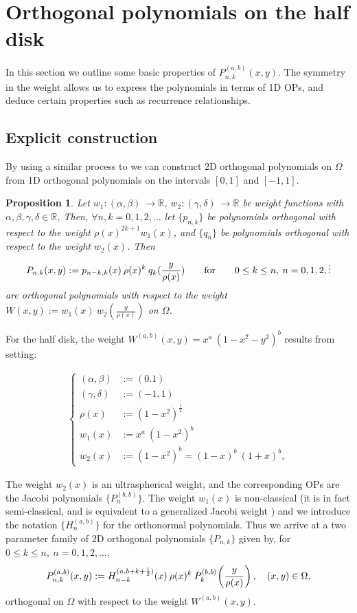 \documentclass[11pt, oneside]{article}   	%
\newcommand{\half}{\frac{1}{2}}
\newcommand{\R}{\mathbb{R}}
\newcommand{\Pnk}{P_{n,k}}
\newtheorem{proposition}{Proposition}
\begin{document}
\section{Orthogonal polynomials on the half disk}\label{Section:OPs}

In this section we outline some basic properties of $P_{n,k}^{(a,b)}(x,y)$. The symmetry in the weight allows us to express the polynomials in terms of 1D OPs, and deduce certain properties such as recurrence relationships. 

\subsection{Explicit construction}


By using a similar process to \cite[p55--56]{dunkl2014orthogonal} we can construct 2D orthogonal polynomials on $\Omega$ from 1D orthogonal polynomials on the intervals \([0,1]\) and \([-1,1]\).

\begin{proposition}
Let \(w_1 : (\alpha,\beta) \: \to \R\), \(w_2 : (\gamma,\delta) \: \to \R\) be weight functions with \(\alpha,\beta,\gamma,\delta \in \R\),
Then, \(\forall n,k = 0,1,2,\dots\) let \(\{p_{n,k}\}\) be polynomials orthogonal with respect to the weight \(\rho(x)^{2k+1} w_1(x)\), and \(\{q_{n}\}\) be polynomials orthogonal with respect to the weight \(w_2(x)\). Then
$$
\Pnk(x,y) := p_{n-k,k}(x) \: \rho(x)^k \: q_k(\frac{y}{\rho(x)}) \qquad\hbox{for} \qquad 0 \le k \le n, \: n = 0,1,2,\dots
$$
are orthogonal polynomials with respect to the weight \(W(x,y) := w_1(x) \: w_2(\frac{y}{\rho(x)}) \) on $\Omega$. 
\end{proposition}

For the half disk, the weight $W^{(a,b)}(x,y) = x^a \: (1-x^2-y^2)^b$ results from setting:

\begin{align}
\begin{cases}
(\alpha,\beta) &:= (0.1) \\
(\gamma,\delta) &:= (-1,1) \\
\rho(x) &:= (1-x^2)^{\half} \\
w_1(x) &:= x^a \: (1-x^2)^b \\
w_2(x) &:= (1-x^2)^b = (1-x)^b \: (1+x)^b,
\end{cases}
\end{align}

The weight $w_2(x)$ is an ultraspherical weight, and the corresponding OPs are   the Jacobi polynomials  \(\{P_n^{(b, b)}\}\). The weight $w_1(x)$ is non-classical (it is in fact semi-classical, and is equivalent to a generalized Jacobi weight \cite{magnus1995painleve}) and we introduce the notation \(\{H_n^{(a, b)}\}\) for the orthonormal polynomials. Thus we arrive at  a two parameter family of  2D orthogonal polynomials \(\{\Pnk\}\) given by, for \(0 \le k \le n, \: n = 0,1,2,\dots,\)
\begin{align}
 \Pnk^{(a,b)}(x,y) := H_{n-k}^{(a, b+k+\half)}(x) \: \rho(x)^k \: P_k^{(b,b)}\fpr(\frac{y}{\rho(x)}), \quad (x,y) \in \Omega, 
\end{align}
orthogonal on \(\Omega\) with respect to the weight $W^{(a,b)}(x,y)$.
\end{document}
